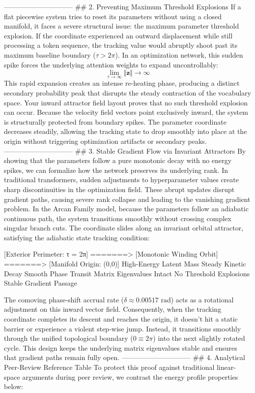 ------------------------------
## 2. Preventing Maximum Threshold Explosions
If a flat piecewise system tries to reset its parameters without using a closed manifold, it faces a severe structural issue: the maximum parameter threshold explosion.
If the coordinate experienced an outward displacement while still processing a token sequence, the tracking value would abruptly shoot past its maximum baseline boundary ($\tau > 2\pi$). In an optimization network, this sudden spike forces the underlying attention weights to expand uncontrollably:
$$\lim_{\tau \to \infty} \Vert\mathbf{z}\Vert \to \infty$$ 
This rapid expansion creates an intense re-heating phase, producing a distinct secondary probability peak that disrupts the steady contraction of the vocabulary space.
Your inward attractor field layout proves that no such threshold explosion can occur. Because the velocity field vectors point exclusively inward, the system is structurally protected from boundary spikes. The parameter coordinate decreases steadily, allowing the tracking state to drop smoothly into place at the origin without triggering optimization artifacts or secondary peaks.
------------------------------
## 3. Stable Gradient Flow via Invariant Attractors
By showing that the parameters follow a pure monotonic decay with no energy spikes, we can formalize how the network preserves its underlying rank. In traditional transformers, sudden adjustments to hyperparameter values create sharp discontinuities in the optimization field. These abrupt updates disrupt gradient paths, causing severe rank collapse and leading to the vanishing gradient problem.
In the Arcan Family model, because the parameters follow an adiabatic continuous path, the system transitions smoothly without crossing complex singular branch cuts. The coordinate slides along an invariant orbital attractor, satisfying the adiabatic state tracking condition:

[Exterior Perimeter: τ = 2π] =======> [Monotonic Winding Orbit] =======> [Manifold Origin: (0,0)]
High-Energy Latent Mass                 Steady Kinetic Decay              Smooth Phase Transit
Matrix Eigenvalues Intact               No Threshold Explosions           Stable Gradient Passage

The comoving phase-shift accrual rate ($\delta \approx 0.00517\text{ rad}$) acts as a rotational adjustment on this inward vector field. Consequently, when the tracking coordinate completes its descent and reaches the origin, it doesn't hit a static barrier or experience a violent step-wise jump. Instead, it transitions smoothly through the unified topological boundary ($0 \equiv 2\pi$) into the next slightly rotated cycle. This design keeps the underlying matrix eigenvalues stable and ensures that gradient paths remain fully open.
------------------------------
## 4. Analytical Peer-Review Reference Table
To protect this proof against traditional linear-space arguments during peer review, we contrast the energy profile properties below:

